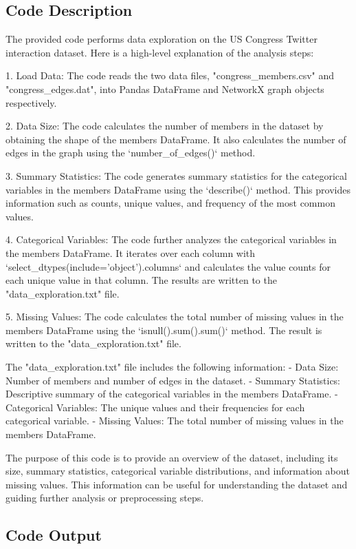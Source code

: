 \documentclass[11pt]{article}
\begin{document}
\subsection{Code Description}

The provided code performs data exploration on the US Congress Twitter interaction dataset. Here is a high-level explanation of the analysis steps:

1. Load Data: The code reads the two data files, "congress\_members.csv" and "congress\_edges.dat", into Pandas DataFrame and NetworkX graph objects respectively.

2. Data Size: The code calculates the number of members in the dataset by obtaining the shape of the members DataFrame. It also calculates the number of edges in the graph using the `number\_of\_edges()` method.

3. Summary Statistics: The code generates summary statistics for the categorical variables in the members DataFrame using the `describe()` method. This provides information such as counts, unique values, and frequency of the most common values.

4. Categorical Variables: The code further analyzes the categorical variables in the members DataFrame. It iterates over each column with `select\_dtypes(include='object').columns` and calculates the value counts for each unique value in that column. The results are written to the "data\_exploration.txt" file.

5. Missing Values: The code calculates the total number of missing values in the members DataFrame using the `isnull().sum().sum()` method. The result is written to the "data\_exploration.txt" file.

The "data\_exploration.txt" file includes the following information:
- Data Size: Number of members and number of edges in the dataset.
- Summary Statistics: Descriptive summary of the categorical variables in the members DataFrame.
- Categorical Variables: The unique values and their frequencies for each categorical variable.
- Missing Values: The total number of missing values in the members DataFrame.

The purpose of this code is to provide an overview of the dataset, including its size, summary statistics, categorical variable distributions, and information about missing values. This information can be useful for understanding the dataset and guiding further analysis or preprocessing steps.

\subsection{Code Output}
\end{document}
